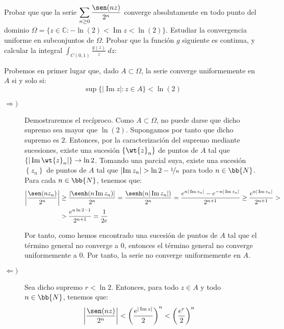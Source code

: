 \documentclass[12pt]{article}
\renewcommand{\Im}{\operatorname{Im}}
\begin{document}
    \begin{ejercicio}[4 puntos]
        Probar que que la serie $\displaystyle \sum_{n\geq 0} \frac{\sen(nz)}{2^n}$ converge absolutamente en todo punto del dominio $\Omega=\{z \in \mathbb{C} : -\ln(2) < \Im z < \ln(2)\}$. Estudiar la convergencia uniforme en subconjuntos de $\Omega$. Probar que la función $g$ siguiente es continua, y calcular la integral $\displaystyle \int_{C(0,1)} \frac{g(z)}{z}\ dz$:

        Probemos en primer lugar que, dado $A\subset \Omega$, la serie converge uniformemente en $A$ si y solo si:
        \begin{equation*}
            \sup\{|\Im z| : z\in A\} < \ln(2)
        \end{equation*}
        \begin{description}
            \item[$\Longrightarrow)$] Demostraremos el recíproco. Como $A\subset \Omega$, no puede darse que dicho supremo sea mayor que $\ln(2)$. Supongamos por tanto que dicho supremo es $2$. Entonces, por la caracterización del supremo mediante sucesiones, existe una sucesión $\left\{\wt{z}_n\right\}$ de puntos de $A$ tal que $\left\{|\Im \wt{z}_n|\right\}\to \ln 2$. Tomando una parcial suya, existe una sucesión $\left\{z_n\right\}$ de puntos de $A$ tal que $\left|\Im z_n\right|>\ln 2 - \nicefrac{1}{n}$ para todo $n\in \bb{N}$.\\
            
            Para cada $n\in \bb{N}$, tenemos que:
            \begin{align*}
                \left|\dfrac{\sen(nz_n)}{2^n}\right| &\geq \dfrac{\left|\senh(n\Im z_n)\right|}{2^{n}}
                = \dfrac{\senh(n|\Im z_n|)}{2^{n}}
                = \dfrac{e^{n|\Im z_n|}-e^{-n|\Im z_n|}}{2^{n+1}} \geq \dfrac{e^{n|\Im z_n|}}{2^{n+1}}
                > \\
                &> \dfrac{e^{n\ln 2 -1}}{2^{n+1}}
                = \dfrac{1}{2e}
            \end{align*}

            Por tanto, como hemos encontrado una sucesión de puntos de $A$ tal que el término general no converge a $0$, entonces el término general no converge uniformemente a $0$. Por tanto, la serie no converge uniformemente en $A$.

            \item[$\Longleftarrow)$] Sea dicho supremo $r<\ln 2$. Entonces, para todo $z\in A$ y todo $n\in \bb{N}$, tenemos que:
            \begin{align*}
                \left|\dfrac{\sen(nz)}{2^n}\right| &<\left(\dfrac{e^{|\Im z|}}{2}\right)^n
                < \left(\dfrac{e^{r}}{2}\right)^n
            \end{align*}


\end{description}
\end{ejercicio}
\end{document}
